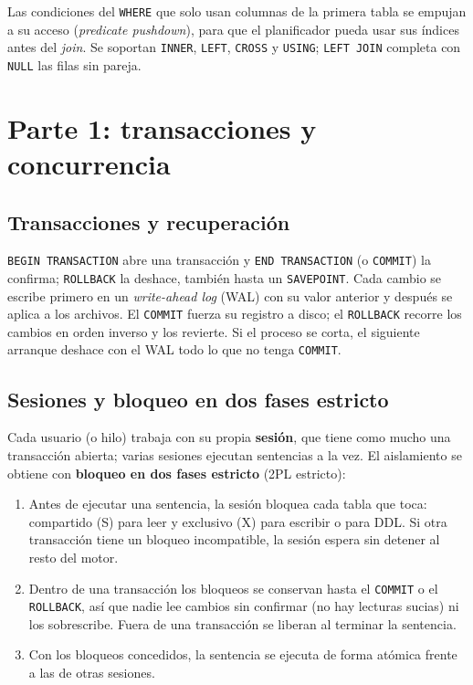 \documentclass[11pt,a4paper]{article}
\begin{document}
Las condiciones del \texttt{WHERE} que solo usan columnas de la primera tabla se empujan a su acceso (\emph{predicate pushdown}), para que el planificador pueda usar sus índices antes del \emph{join}. Se soportan \texttt{INNER}, \texttt{LEFT}, \texttt{CROSS} y \texttt{USING}; \texttt{LEFT JOIN} completa con \texttt{NULL} las filas sin pareja.

\section{Parte 1: transacciones y concurrencia}
\label{sec:concurrencia}

\subsection{Transacciones y recuperación}

\texttt{BEGIN TRANSACTION} abre una transacción y \texttt{END TRANSACTION} (o \texttt{COMMIT}) la confirma; \texttt{ROLLBACK} la deshace, también hasta un \texttt{SAVEPOINT}. Cada cambio se escribe primero en un \emph{write-ahead log} (WAL) con su valor anterior y después se aplica a los archivos. El \texttt{COMMIT} fuerza su registro a disco; el \texttt{ROLLBACK} recorre los cambios en orden inverso y los revierte. Si el proceso se corta, el siguiente arranque deshace con el WAL todo lo que no tenga \texttt{COMMIT}.

\subsection{Sesiones y bloqueo en dos fases estricto}

Cada usuario (o hilo) trabaja con su propia \textbf{sesión}, que tiene como mucho una transacción abierta; varias sesiones ejecutan sentencias a la vez. El aislamiento se obtiene con \textbf{bloqueo en dos fases estricto} (2PL estricto):

\begin{enumerate}
  \item Antes de ejecutar una sentencia, la sesión bloquea cada tabla que toca: compartido (S) para leer y exclusivo (X) para escribir o para DDL. Si otra transacción tiene un bloqueo incompatible, la sesión espera sin detener al resto del motor.
  \item Dentro de una transacción los bloqueos se conservan hasta el \texttt{COMMIT} o el \texttt{ROLLBACK}, así que nadie lee cambios sin confirmar (no hay lecturas sucias) ni los sobrescribe. Fuera de una transacción se liberan al terminar la sentencia.
  \item Con los bloqueos concedidos, la sentencia se ejecuta de forma atómica frente a las de otras sesiones.
\end{enumerate}
\end{document}
